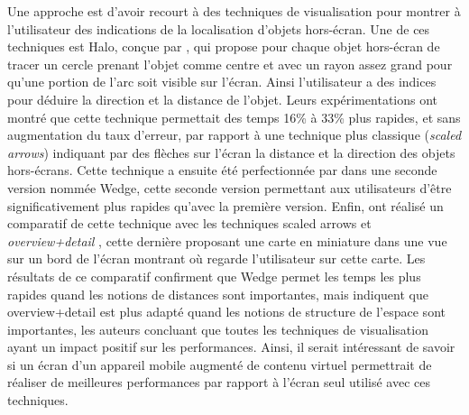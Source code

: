 Une approche est d'avoir recourt à des techniques de visualisation pour montrer à l'utilisateur des indications de la localisation d'objets hors-écran. Une de ces techniques est Halo, conçue par \citet{BaudischRosenholtz2003}, qui propose pour chaque objet hors-écran de tracer un cercle prenant l'objet comme centre et avec un rayon assez grand pour qu'une portion de l'arc soit visible sur l'écran. Ainsi l'utilisateur a des indices pour déduire la direction et la distance de l'objet. Leurs expérimentations ont montré que cette technique permettait des temps 16\% à 33\% plus rapides, et sans augmentation du taux d'erreur, par rapport à une technique plus classique (\emph{scaled arrows}) indiquant par des flèches sur l'écran la distance et la direction des objets hors-écrans. Cette technique a ensuite été perfectionnée par \citet{GustafsonBaudischGutwinEtAl2008} dans une seconde version nommée Wedge, cette seconde version permettant aux utilisateurs d'être significativement plus rapides qu'avec la première version. Enfin, \citet{BurigatChittaro2011} ont réalisé un comparatif de cette technique avec les techniques \foreignlanguage{english}{scaled arrows} et \emph{overview+detail} , cette dernière proposant une carte en miniature dans une vue sur un bord de l'écran montrant où regarde l'utilisateur sur cette carte. Les résultats de ce comparatif confirment que Wedge permet les temps les plus rapides quand les notions de distances sont importantes, mais indiquent que overview+detail est plus adapté quand les notions de structure de l'espace sont importantes, les auteurs concluant que toutes les techniques de visualisation ayant un impact positif sur les performances. Ainsi, il serait intéressant de savoir si un écran d'un appareil mobile augmenté de contenu virtuel permettrait de réaliser de meilleures performances par rapport à l'écran seul utilisé avec ces techniques.




